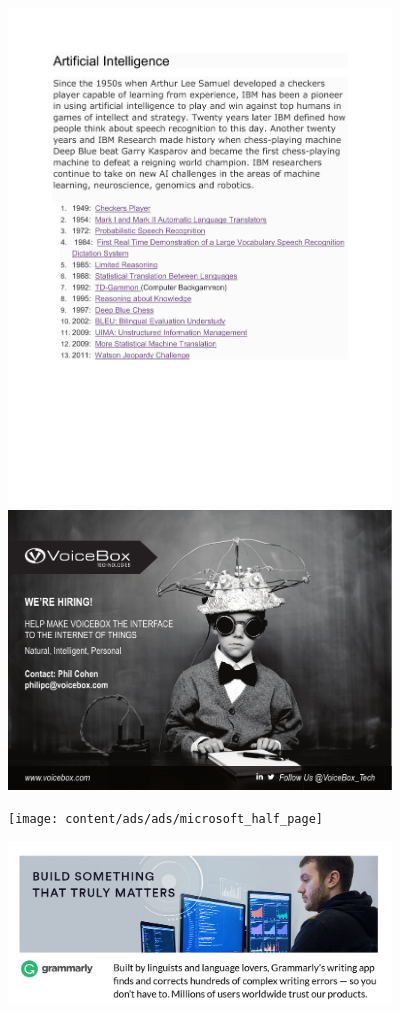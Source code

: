 \thispagestyle{empty}
\includegraphics[width=4in]{content/ads/ads/ibm_half_page} \\

\thispagestyle{empty}
\includegraphics[width=4in]{content/ads/ads/voicebox_quarter_page}

\thispagestyle{empty}
\begin{center}
\texttt{[image: content/ads/ads/microsoft\_half\_page]} \\
\end{center}

\thispagestyle{empty}
\includegraphics[width=4in]{content/ads/ads/grammarly_quarter_page}

